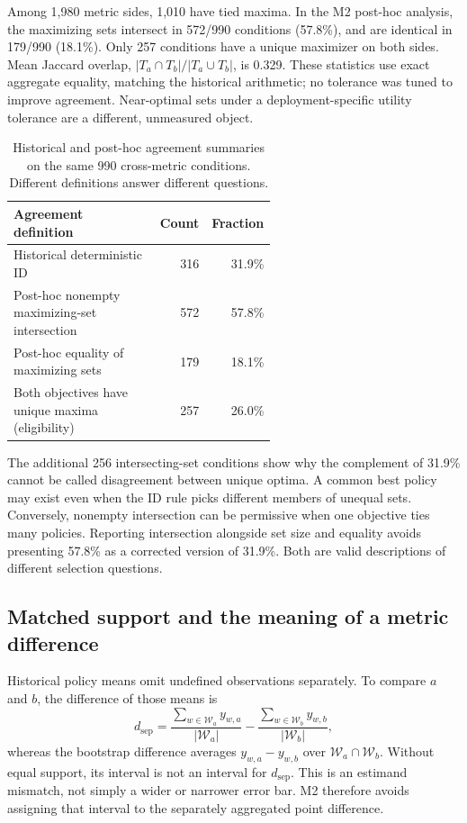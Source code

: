 Among 1,980 metric sides, 1,010 have tied maxima. In the M2 post-hoc
analysis, the maximizing sets intersect in 572/990 conditions (57.8\%),
and are identical in 179/990 (18.1\%). Only 257 conditions have a unique
maximizer on both sides. Mean Jaccard overlap,
$|T_a\cap T_b|/|T_a\cup T_b|$, is 0.329. These statistics use exact
aggregate equality, matching the historical arithmetic; no tolerance was
tuned to improve agreement. Near-optimal sets under a deployment-specific
utility tolerance are a different, unmeasured object.

\begin{table}[t]\centering
\caption{Historical and post-hoc agreement summaries on the same 990
cross-metric conditions. Different definitions answer different questions.}
\label{tab:top-sets}
\begin{tabular}{p{0.58\linewidth}rr}\toprule
Agreement definition & Count & Fraction\\\midrule
Historical deterministic ID & 316 & 31.9\%\\
Post-hoc nonempty maximizing-set intersection & 572 & 57.8\%\\
Post-hoc equality of maximizing sets & 179 & 18.1\%\\
Both objectives have unique maxima (eligibility) & 257 & 26.0\%\\\bottomrule
\end{tabular}\end{table}
The additional 256 intersecting-set conditions show why the complement
of 31.9\% cannot be called disagreement between unique optima. A common
best policy may exist even when the ID rule picks different members of
unequal sets. Conversely, nonempty intersection can be permissive when
one objective ties many policies. Reporting intersection alongside set
size and equality avoids presenting 57.8\% as a corrected version of
31.9\%. Both are valid descriptions of different selection questions.

\subsection{Matched support and the meaning of a metric difference}
Historical policy means omit undefined observations separately. To compare
$a$ and $b$, the difference of those means is
\begin{equation}
 d_{\mathrm{sep}}=
 \frac{\sum_{w\in\mathcal W_a}y_{w,a}}{|\mathcal W_a|}
 -\frac{\sum_{w\in\mathcal W_b}y_{w,b}}{|\mathcal W_b|},
\end{equation}
whereas the bootstrap difference averages $y_{w,a}-y_{w,b}$ over
$\mathcal W_a\cap\mathcal W_b$. Without equal support, its interval is
not an interval for $d_{\mathrm{sep}}$. This is an estimand mismatch,
not simply a wider or narrower error bar. M2 therefore avoids assigning
that interval to the separately aggregated point difference.

